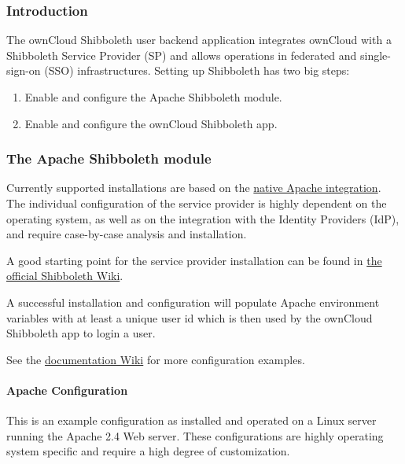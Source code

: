 \documentclass[letterpaper,10pt,english]{sphinxmanual}
\begin{document}
\subsubsection{Introduction}
\label{enterprise_user_management/user_auth_shibboleth:introduction}
The ownCloud Shibboleth user backend application integrates ownCloud with a
Shibboleth Service Provider (SP) and allows operations in federated and
single-sign-on (SSO) infrastructures. Setting up Shibboleth has two big steps:
\begin{enumerate}
\item {} 
Enable and configure the Apache Shibboleth module.

\item {} 
Enable and configure the ownCloud Shibboleth app.

\end{enumerate}


\subsubsection{The Apache Shibboleth module}
\label{enterprise_user_management/user_auth_shibboleth:the-apache-shibboleth-module}
Currently supported installations are based on the \href{https://wiki.shibboleth.net/confluence/display/SHIB2/NativeSPApacheConfig}{native Apache integration}.
The individual configuration of the service provider is highly dependent on
the operating system, as well as on the integration with the Identity
Providers (IdP), and require case-by-case analysis and installation.

A good starting point for the service provider installation can be found in
\href{https://wiki.shibboleth.net/confluence/display/SHIB2/NativeSPLinuxInstall}{the official Shibboleth Wiki}.

A successful installation and configuration will populate Apache environment
variables with at least a unique user id which is then used by the ownCloud
Shibboleth app to login a user.

See the \href{https://github.com/owncloud/documentation/wiki/Shibboleth-example-configurations}{documentation Wiki} for more configuration examples.


\paragraph{Apache Configuration}
\label{enterprise_user_management/user_auth_shibboleth:apache-configuration}
This is an example configuration as installed and operated on a Linux server
running the Apache 2.4 Web server. These configurations are highly operating system
specific and require a high degree of customization.
\end{document}
